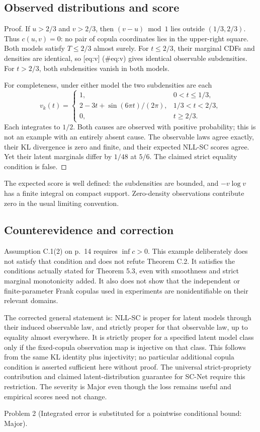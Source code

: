 \documentclass[10pt]{article}
\begin{document}
\subsection*{Observed distributions and score}
Proof. If \(u>2/3\) and \(v>2/3\), then \((v-u)\bmod1\) lies outside \((1/3,2/3)\). Thus \(c(u,v)=0\): no pair of copula coordinates lies in the upper-right square. Both models satisfy \(T\leq2/3\) almost surely. For \(t\leq2/3\), their marginal CDFs and densities are identical, so [eq:v] (\#eq:v) gives identical observable subdensities. For \(t>2/3\), both subdensities vanish in both models.\par
For completeness, under either model the two subdensities are each \[v_k(t)=
 \begin{cases}
 1,&0<t\leq1/3,\\
 2-3t+\sin(6\pi t)/(2\pi),&1/3<t<2/3,\\
 0,&t\geq2/3.
 \end{cases}\] Each integrates to \(1/2\). Both causes are observed with positive probability; this is not an example with an entirely absent cause. The observable laws agree exactly, their KL divergence is zero and finite, and their expected NLL-SC scores agree. Yet their latent marginals differ by \(1/48\) at \(5/6\). The claimed strict equality condition is false. ◻\par
The expected score is well defined: the subdensities are bounded, and \(-v\log v\) has a finite integral on compact support. Zero-density observations contribute zero in the usual limiting convention.\par
\subsection*{Counterevidence and correction}
Assumption C.1(2) on p. 14 requires \(\inf c>0\). This example deliberately does not satisfy that condition and does not refute Theorem C.2. It satisfies the conditions actually stated for Theorem 5.3, even with smoothness and strict marginal monotonicity added. It also does not show that the independent or finite-parameter Frank copulas used in experiments are nonidentifiable on their relevant domains.\par
The corrected general statement is: NLL-SC is proper for latent models through their induced observable law, and strictly proper for that observable law, up to equality almost everywhere. It is strictly proper for a specified latent model class only if the fixed-copula observation map is injective on that class. This follows from the same KL identity plus injectivity; no particular additional copula condition is asserted sufficient here without proof. The universal strict-propriety contribution and claimed latent-distribution guarantee for SC-Net require this restriction. The severity is Major even though the loss remains useful and empirical scores need not change.\par
Problem 2 (Integrated error is substituted for a pointwise conditional bound: Major).\par
\end{document}
